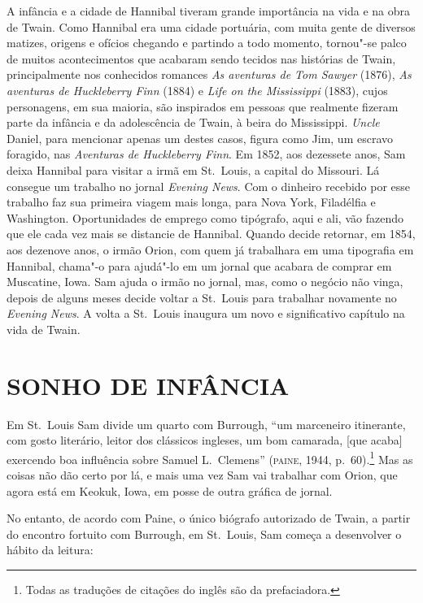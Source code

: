 A infância e a cidade de Hannibal tiveram grande importância na vida e
na obra de Twain. Como Hannibal era uma cidade
portuária, com muita gente de diversos
matizes, origens e ofícios chegando e partindo a todo momento, tornou"-se
palco de muitos acontecimentos que acabaram sendo tecidos nas
histórias de Twain, principalmente nos conhecidos romances \textit{As aventuras de
Tom Sawyer} (1876), \textit{As aventuras de Huckleberry Finn} (1884) e
\textit{Life on the Mississippi} (1883), cujos personagens, em sua
maioria, são inspirados em pessoas que realmente fizeram parte da infância e
da adolescência de Twain, à beira do Mississippi. \textit{Uncle} Daniel, para mencionar apenas
um destes casos, figura como Jim, um escravo foragido, nas
\textit{Aventuras de Huckleberry Finn}. Em 1852, aos dezessete anos, Sam deixa
Hannibal para visitar a irmã em St.~Louis, a capital do Missouri. Lá
consegue um trabalho no jornal \textit{Evening News}. Com o dinheiro recebido por esse
trabalho faz sua primeira viagem mais longa, para Nova York, Filadélfia
e Washington. Oportunidades de emprego como tipógrafo, aqui e ali, vão
fazendo que ele cada vez mais se distancie de Hannibal. Quando decide retornar,
em 1854, aos dezenove anos, o irmão Orion, com quem já trabalhara
em uma tipografia em Hannibal, chama"-o para ajudá"-lo em um jornal que
acabara de comprar em Muscatine, Iowa. Sam ajuda o irmão no jornal, mas,
como o negócio não vinga, depois de alguns meses decide voltar a St.~Louis
para trabalhar novamente no \textit{Evening News}. A volta a St.~Louis inaugura 
um novo e significativo capítulo na vida de Twain.

\section{SONHO DE INFÂNCIA} 

Em St.~Louis Sam divide um quarto com Burrough,
``um marceneiro itinerante, com gosto literário, leitor dos clássicos ingleses,
um bom camarada, [que acaba] exercendo boa influência sobre Samuel L.~Clemens''
(\textsc{paine}, 1944, p.~60).\footnote{ Todas as traduções
de citações do inglês são da prefaciadora.} Mas as coisas não dão certo por lá, e mais uma vez Sam vai
trabalhar com Orion, que agora está em Keokuk, Iowa, em posse de outra
gráfica de jornal.

No entanto, de acordo com Paine, o único biógrafo autorizado de Twain, a
partir do encontro fortuito com Burrough, em St.~Louis, Sam começa a
desenvolver o hábito da leitura:

